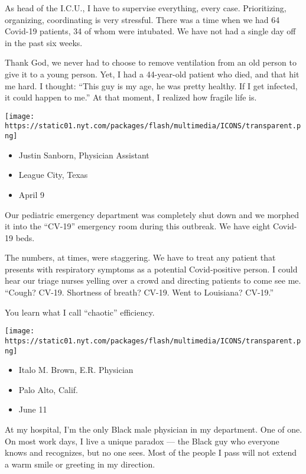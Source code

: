 As head of the I.C.U., I have to supervise everything, every case.
Prioritizing, organizing, coordinating is very stressful. There was a
time when we had 64 Covid-19 patients, 34 of whom were intubated. We
have not had a single day off in the past six weeks.

Thank God, we never had to choose to remove ventilation from an old
person to give it to a young person. Yet, I had a 44-year-old patient
who died, and that hit me hard. I thought: ``This guy is my age, he was
pretty healthy. If I get infected, it could happen to me.'' At that
moment, I realized how fragile life is.

\texttt{[image: https://static01.nyt.com/packages/flash/multimedia/ICONS/transparent.png]}

\begin{itemize}
\tightlist
\item
  Justin Sanborn, Physician Assistant
\item
  League City, Texas
\item
  April 9
\end{itemize}

Our pediatric emergency department was completely shut down and we
morphed it into the ``CV-19'' emergency room during this outbreak. We
have eight Covid-19 beds.

The numbers, at times, were staggering. We have to treat any patient
that presents with respiratory symptoms as a potential Covid-positive
person. I could hear our triage nurses yelling over a crowd and
directing patients to come see me. ``Cough? CV-19. Shortness of breath?
CV-19. Went to Louisiana? CV-19.''

You learn what I call ``chaotic'' efficiency.

\texttt{[image: https://static01.nyt.com/packages/flash/multimedia/ICONS/transparent.png]}

\begin{itemize}
\tightlist
\item
  Italo M. Brown, E.R. Physician
\item
  Palo Alto, Calif.
\item
  June 11
\end{itemize}

At my hospital, I'm the only Black male physician in my department. One
of one. On most work days, I live a unique paradox --- the Black guy who
everyone knows and recognizes, but no one sees. Most of the people I
pass will not extend a warm smile or greeting in my direction.

